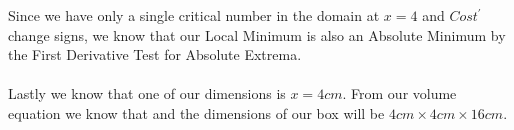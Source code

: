 \documentclass[10pt]{article}
\begin{document}
{\begin{center}
\end{center}
Since we have only a single critical number in the domain at $x=4$ and $Cost^{\prime}$ change signs, we know that our Local Minimum is also an Absolute Minimum by the First Derivative Test for Absolute Extrema.\\\\
Lastly we know that one of our dimensions is $x=4cm$. From our volume equation we know that 
 and the dimensions of our box will be $4cm\times 4cm \times 16cm$.
}


\newpage%
\end{document}
